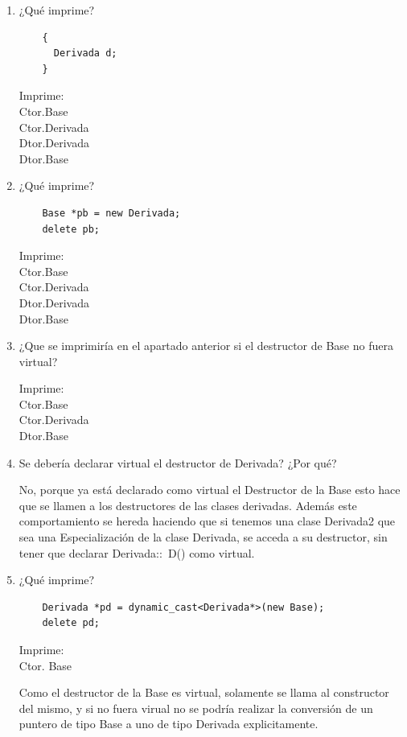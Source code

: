 \begin{enumerate}[label = \alph*)]
  \item ¿Qué imprime? \begin{verbatim}
    {
      Derivada d;
    }
  \end{verbatim}
  Imprime:\\
  Ctor.Base\\Ctor.Derivada\\Dtor.Derivada\\Dtor.Base

  \item ¿Qué imprime?
  \begin{verbatim}
    Base *pb = new Derivada;
    delete pb;
  \end{verbatim}
  Imprime:\\
  Ctor.Base\\Ctor.Derivada\\Dtor.Derivada\\Dtor.Base
  \newpage
  \item ¿Que se imprimiría en el apartado anterior si el destructor de Base no fuera virtual?
  
  Imprime:\\
  Ctor.Base\\Ctor.Derivada\\Dtor.Base

  \item Se debería declarar virtual el destructor de Derivada? ¿Por qué?

  No, porque ya está declarado como virtual el Destructor de la Base esto hace que se llamen a los destructores de las clases derivadas. Además este comportamiento se hereda haciendo que si tenemos una clase Derivada2 que sea una Especialización de la clase Derivada, se acceda a su destructor, sin tener que declarar Derivada::~D() como virtual.

  \item ¿Qué imprime?\begin{verbatim}
    Derivada *pd = dynamic_cast<Derivada*>(new Base);
    delete pd;
  \end{verbatim}
  Imprime:\\
    Ctor. Base

  Como el destructor de la Base es virtual, solamente se llama al constructor del mismo, y si no fuera virual no se podría realizar la conversión de un puntero de tipo Base a uno de tipo Derivada explicitamente.
  
\end{enumerate}